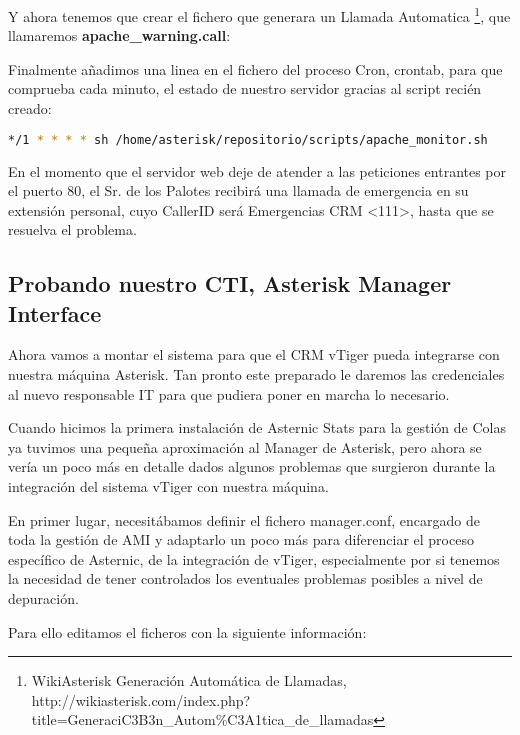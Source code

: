 Y ahora tenemos que crear el fichero que generara un Llamada Automatica \footnote{WikiAsterisk Generación Automática de Llamadas, \\ http://wikiasterisk.com/index.php?title=GeneraciC3B3n\_Autom\%C3A1tica\_de\_llamadas}, que llamaremos \textbf{apache\_warning.call}:



Finalmente añadimos una linea en el fichero del proceso Cron, crontab, para que comprueba cada minuto, el estado de nuestro servidor gracias al script recién creado:

\begin{lstlisting}[language=bash,title={/etc/crontab}]
*/1 * * * * sh /home/asterisk/repositorio/scripts/apache_monitor.sh
\end{lstlisting}

En el momento que el servidor web deje de atender a las peticiones entrantes por el puerto 80, el Sr. de los Palotes recibirá una llamada de emergencia en su extensión personal, cuyo CallerID será Emergencias CRM <111>, hasta que se resuelva el problema.

\subsection{Probando nuestro CTI, Asterisk Manager Interface}

Ahora vamos a montar el sistema para que el CRM vTiger pueda integrarse con nuestra máquina Asterisk. Tan pronto este preparado le daremos las credenciales al nuevo responsable IT para que pudiera poner en marcha lo necesario.

Cuando hicimos la primera instalación de Asternic Stats para la gestión de Colas ya tuvimos una pequeña aproximación al Manager de Asterisk, pero ahora se vería un poco más en detalle dados algunos problemas que surgieron durante la integración del sistema vTiger con nuestra máquina.

En primer lugar, necesitábamos definir el fichero manager.conf, encargado de toda la gestión de AMI y adaptarlo un poco más para diferenciar el proceso específico de Asternic, de la integración de vTiger, especialmente por si tenemos la necesidad de tener controlados los eventuales problemas posibles a nivel de depuración.

Para ello editamos el ficheros con la siguiente información:




